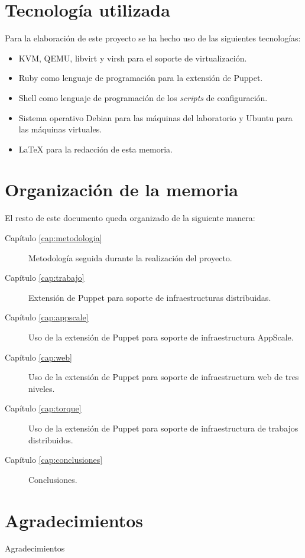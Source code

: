 \section{Tecnología utilizada}

Para la elaboración de este proyecto se ha hecho uso de las siguientes tecnologías:
\begin{itemize}
\item KVM, QEMU, libvirt y virsh para el soporte de virtualización.
\item Ruby como lenguaje de programación para la extensión de Puppet.
\item Shell como lenguaje de programación de los \emph{scripts} de configuración.
\item Sistema operativo Debian para las máquinas del laboratorio y Ubuntu para las máquinas virtuales.
\item \LaTeX{} \cite{manual:latex} para la redacción de esta memoria.
\end{itemize}


\section{Organización de la memoria}

El resto de este documento queda organizado de la siguiente manera:
\begin{description}
\item[Capítulo \ref{cap:metodologia}] Metodología seguida durante la realización del proyecto.
\item[Capítulo \ref{cap:trabajo}] Extensión de Puppet para soporte de infraestructuras distribuidas.
\item[Capítulo \ref{cap:appscale}] Uso de la extensión de Puppet para soporte de infraestructura AppScale.
\item[Capítulo \ref{cap:web}] Uso de la extensión de Puppet para soporte de infraestructura web de tres niveles.
\item[Capítulo \ref{cap:torque}] Uso de la extensión de Puppet para soporte de infraestructura de trabajos distribuidos.
\item[Capítulo \ref{cap:conclusiones}] Conclusiones.
\end{description}


\section{Agradecimientos}

Agradecimientos
